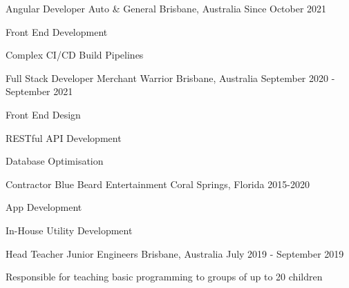 


\begin{cventries}

\cventry
{Angular Developer} %
{Auto \& General} %
{Brisbane, Australia} %
{Since October 2021} %
{ %
\begin{cvitems}
\item {Front End Development}
\item {Complex CI/CD Build Pipelines}
\end{cvitems}
}

\cventry
{Full Stack Developer} %
{Merchant Warrior} %
{Brisbane, Australia} %
{September 2020 - September 2021} %
{ %
\begin{cvitems}
\item {Front End Design}
\item {RESTful API Development}
\item {Database Optimisation}
\end{cvitems}
}


\cventry
{Contractor} %
{Blue Beard Entertainment} %
{Coral Springs, Florida} %
{2015-2020} %
{ %
\begin{cvitems}
\item {App Development}
\item {In-House Utility Development}
\end{cvitems}
}


\cventry
{Head Teacher} %
{Junior Engineers} %
{Brisbane, Australia} %
{July 2019 - September 2019} %
{ %
\begin{cvitems}
\item {Responsible for teaching basic programming to groups of up to 20 children}
\end{cvitems}
}


\end{cventries}
